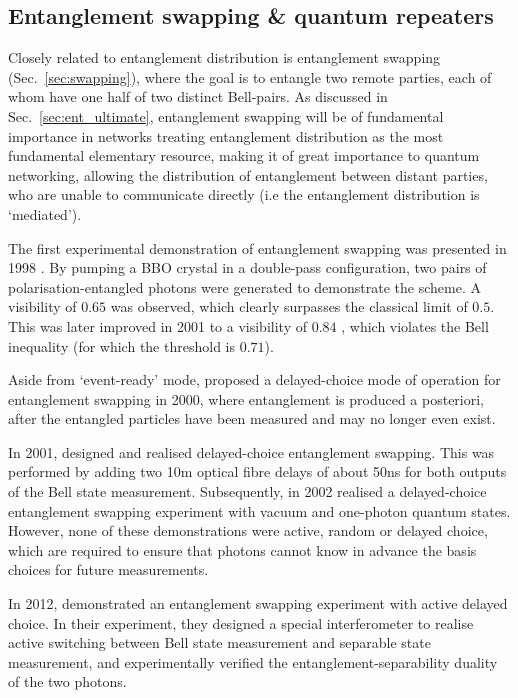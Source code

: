 \documentclass[aps, rmp, twocolumn, amsmath, amssymb, nofootinbib, superscriptaddress, longbibliography, floatfix, table-of-contents, eqsecnum]{revtex4-1}
\begin{document}
%
%

\subsection{Entanglement swapping \& quantum repeaters}  

Closely related to entanglement distribution is entanglement swapping (Sec.~\ref{sec:swapping}), where the goal is to entangle two remote parties, each of whom have one half of two distinct Bell-pairs. As discussed in Sec.~\ref{sec:ent_ultimate}, entanglement swapping will be of fundamental importance in networks treating entanglement distribution as the most fundamental elementary resource, making it of great importance to quantum networking, allowing the distribution of entanglement between distant parties, who are unable to communicate directly (i.e the entanglement distribution is `mediated').

The first experimental demonstration of entanglement swapping was presented in 1998 \cite{bib:PRL_80_3891}. By pumping a BBO crystal in a double-pass configuration, two pairs of polarisation-entangled photons were generated to demonstrate the scheme. A visibility of \mbox{$0.65$} was observed, which clearly surpasses the classical limit of \mbox{$0.5$}. This was later improved in 2001 to a visibility of \mbox{$0.84$} \cite{bib:PRL_86_4435}, which violates the Bell inequality (for which the threshold is $0.71$). 

Aside from `event-ready' mode, \cite{bib:JMO_47_2} proposed a delayed-choice mode of operation for entanglement swapping in 2000, where entanglement is produced a posteriori, after the entangled particles have been measured and may no longer even exist.

In 2001, \cite{bib:PRL_88_017903} designed and realised delayed-choice entanglement swapping. This was performed by adding two 10m optical fibre delays of about 50ns for both outputs of the Bell state measurement. Subsequently, in 2002 \cite{bib:PRA_66_024309} realised a delayed-choice entanglement swapping experiment with vacuum and one-photon quantum states. However, none of these demonstrations were active, random or delayed choice, which are required to ensure that photons cannot know in advance the basis choices for future measurements.

In 2012, \cite{bib:Nat_Phys_8_479} demonstrated an entanglement swapping experiment with active delayed choice. In their experiment, they designed a special interferometer to realise active switching between Bell state measurement and separable state measurement, and experimentally verified the entanglement-separability duality of the two photons. 
\end{document}

